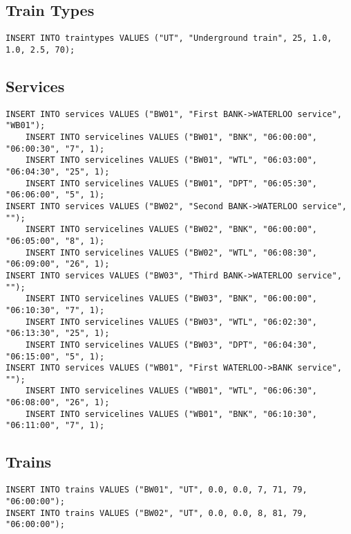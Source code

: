 \documentclass[12pt,a4paper]{article}
\begin{document}
\subsection{Train Types}
\begin{verbatim}
INSERT INTO traintypes VALUES ("UT", "Underground train", 25, 1.0, 1.0, 2.5, 70);
\end{verbatim}

\subsection{Services}
\begin{verbatim}
INSERT INTO services VALUES ("BW01", "First BANK->WATERLOO service", "WB01");
    INSERT INTO servicelines VALUES ("BW01", "BNK", "06:00:00", "06:00:30", "7", 1);
    INSERT INTO servicelines VALUES ("BW01", "WTL", "06:03:00", "06:04:30", "25", 1);
    INSERT INTO servicelines VALUES ("BW01", "DPT", "06:05:30", "06:06:00", "5", 1);
INSERT INTO services VALUES ("BW02", "Second BANK->WATERLOO service", "");
    INSERT INTO servicelines VALUES ("BW02", "BNK", "06:00:00", "06:05:00", "8", 1);
    INSERT INTO servicelines VALUES ("BW02", "WTL", "06:08:30", "06:09:00", "26", 1);
INSERT INTO services VALUES ("BW03", "Third BANK->WATERLOO service", "");
    INSERT INTO servicelines VALUES ("BW03", "BNK", "06:00:00", "06:10:30", "7", 1);
    INSERT INTO servicelines VALUES ("BW03", "WTL", "06:02:30", "06:13:30", "25", 1);
    INSERT INTO servicelines VALUES ("BW03", "DPT", "06:04:30", "06:15:00", "5", 1);
INSERT INTO services VALUES ("WB01", "First WATERLOO->BANK service", "");
    INSERT INTO servicelines VALUES ("WB01", "WTL", "06:06:30", "06:08:00", "26", 1);
    INSERT INTO servicelines VALUES ("WB01", "BNK", "06:10:30", "06:11:00", "7", 1);
\end{verbatim}

\subsection{Trains}
\begin{verbatim}
INSERT INTO trains VALUES ("BW01", "UT", 0.0, 0.0, 7, 71, 79, "06:00:00");
INSERT INTO trains VALUES ("BW02", "UT", 0.0, 0.0, 8, 81, 79, "06:00:00");
\end{verbatim}
\end{document}

